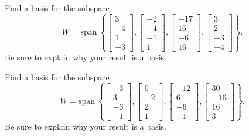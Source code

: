 \documentclass{article}
\begin{document}
\begin{exerciseStatement}
    Find a basis for the subspace
\[W=\mathrm{span}\ \left\{\left[\begin{array}{r}
3 \\
-4 \\
1 \\
-3
\end{array}\right] , \left[\begin{array}{r}
-2 \\
-4 \\
-1 \\
1
\end{array}\right] , \left[\begin{array}{r}
-17 \\
16 \\
-6 \\
16
\end{array}\right] , \left[\begin{array}{r}
3 \\
2 \\
-3 \\
-4
\end{array}\right]\right\}.\]
 Be sure to explain why your result is a basis.


  
\end{exerciseStatement}

\begin{exerciseStatement}
    Find a basis for the subspace
\[W=\mathrm{span}\ \left\{\left[\begin{array}{r}
-3 \\
3 \\
-3 \\
-1
\end{array}\right] , \left[\begin{array}{r}
0 \\
-2 \\
2 \\
1
\end{array}\right] , \left[\begin{array}{r}
-12 \\
6 \\
-6 \\
-1
\end{array}\right] , \left[\begin{array}{r}
30 \\
-16 \\
16 \\
3
\end{array}\right]\right\}.\]
 Be sure to explain why your result is a basis.


  
\end{exerciseStatement}
\end{document}

